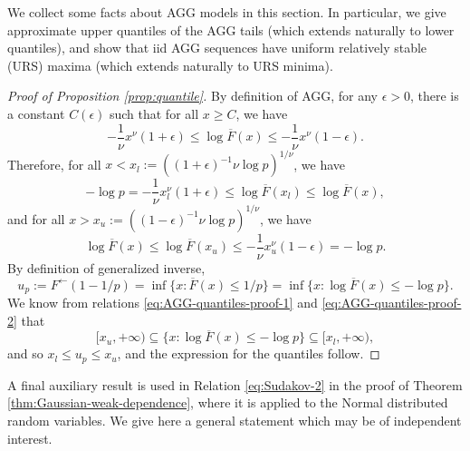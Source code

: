 We collect some facts about AGG models in this section.
In particular, we give approximate upper quantiles of the AGG tails (which extends naturally to lower quantiles), and show that iid AGG sequences have uniform relatively stable (URS) maxima (which extends naturally to URS minima).

% 
\begin{proof}[Proof of Proposition \ref{prop:quantile}]
By definition of AGG, for any $\epsilon>0$, there is a constant $C(\epsilon)$ such that for all $x\ge C$, we have
$$
-\frac{1}{\nu}x^\nu(1+\epsilon) \le \log{\overline{F}(x)} \le -\frac{1}{\nu}x^\nu(1-\epsilon).
$$
Therefore, for all $x < x_l := \left((1+\epsilon)^{-1}\nu\log{p}\right)^{1/\nu}$, we have
\begin{equation} \label{eq:AGG-quantiles-proof-1}
    -\log{p} = -\frac{1}{\nu}x_l^\nu(1+\epsilon) \le \log{\overline{F}(x_l)} \le \log{\overline{F}(x)},
\end{equation}
and for all $x > x_u := \left((1-\epsilon)^{-1}\nu\log{p}\right)^{1/\nu}$, we have
\begin{equation} \label{eq:AGG-quantiles-proof-2}
    \log{\overline{F}(x)} \le \log{\overline{F}(x_u)} \le -\frac{1}{\nu}x_u^\nu(1-\epsilon) = -\log{p}.
\end{equation}
By definition of generalized inverse,
\begin{equation*}
    u_p := F^\leftarrow(1-1/p) = \inf\{x:\overline{F}(x)\le 1/p\} = \inf\{x:\log{\overline{F}(x)} \le -\log{p}\}.
\end{equation*}
We know from relations \eqref{eq:AGG-quantiles-proof-1} and \eqref{eq:AGG-quantiles-proof-2} that 
$$
[x_u, +\infty) \subseteq \{x:\log{\overline{F}(x)} \le -\log{p}\} \subseteq [x_l, +\infty),
$$
and so $x_l\le u_p \le x_u$, and the expression for the quantiles follow.
\end{proof}

A final auxiliary result is used in Relation \eqref{eq:Sudakov-2} in the proof of Theorem \ref{thm:Gaussian-weak-dependence},
where it is applied to the Normal distributed random variables.
We give here a general statement which may be of independent interest.

